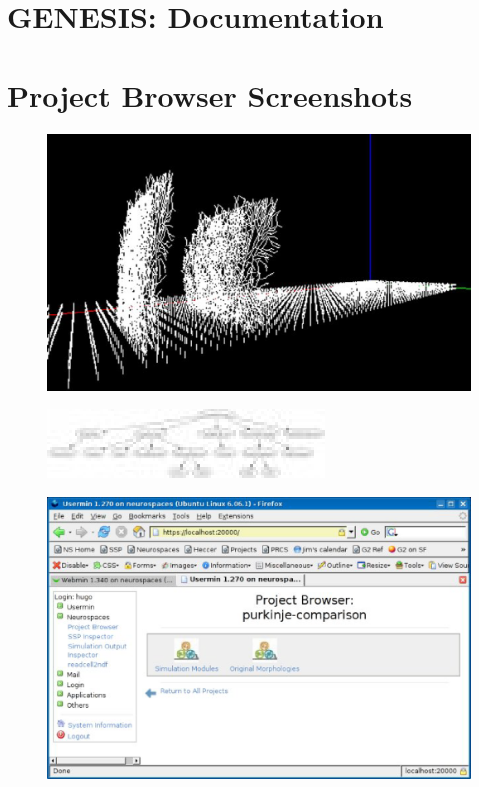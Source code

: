 \documentclass[12pt]{article}
\begin{document}
\section*{GENESIS: Documentation}

\section*{Project Browser Screenshots}

\begin{figure}[h]
  \centering
 \includegraphics[scale=0.6]{figures/screenshot-1.eps}
  \label{fig:pb-1}
\end{figure}

\begin{figure}[h]
  \centering
 \includegraphics[scale=0.6]{figures/screenshot-2.eps}
  \label{fig:pb-1}
\end{figure}

\begin{figure}[h]
  \centering
 \includegraphics[scale=0.6]{figures/screenshot-3.eps}
  \label{fig:pb-1}
\end{figure}
\end{document}
